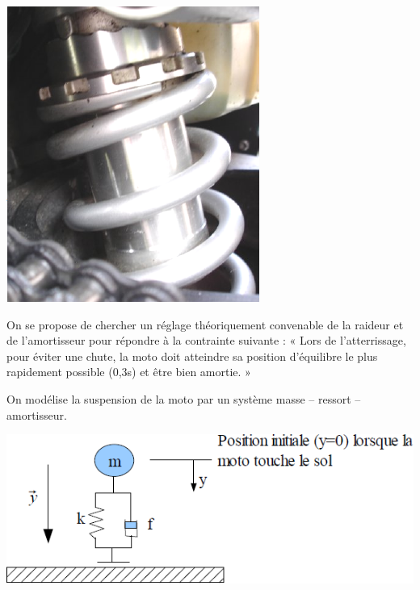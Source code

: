 \documentclass[11pt,oneside]{article}
\begin{document}
{\begin{minipage}[c]{.3\linewidth}
\begin{center}
\includegraphics[width=.8\textwidth]{png/image2}
\end{center}
\end{minipage}

\begin{minipage}[c]{.5\linewidth}
On se propose de chercher un réglage théoriquement convenable de la
raideur et de l'amortisseur pour répondre à la contrainte suivante :
« Lors de l'atterrissage, pour éviter une chute, la moto doit atteindre
sa position d'équilibre le plus rapidement possible (0,3s) et être bien
amortie. »

On modélise la suspension de la moto par un système masse -- ressort -- amortisseur.

\end{minipage}\hfill
\begin{minipage}[c]{.45\linewidth}

\begin{center}
\includegraphics[width=.95\textwidth]{png/image3}
\end{center}
\end{minipage}


}
\end{document}
